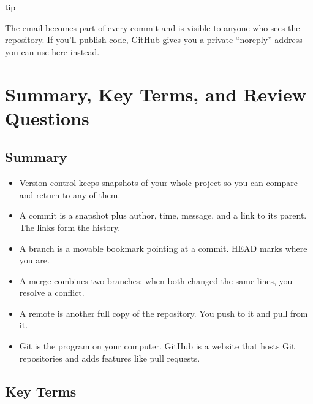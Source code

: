 \begin{callout}{tip}

The email becomes part of every commit and is visible to anyone who sees the repository. If you'll publish code, GitHub gives you a private ``noreply'' address you can use here instead.

\end{callout}

\section{Summary, Key Terms, and Review Questions}\label{04-why-code-needs-a-history:summary-key-terms-and-review-questions}

\subsection*{Summary}\label{04-why-code-needs-a-history:summary}

\begin{itemize}
\tightlist
\item
  Version control keeps snapshots of your whole project so you can compare and return to any of them.
\item
  A commit is a snapshot plus author, time, message, and a link to its parent. The links form the history.
\item
  A branch is a movable bookmark pointing at a commit. HEAD marks where you are.
\item
  A merge combines two branches; when both changed the same lines, you resolve a conflict.
\item
  A remote is another full copy of the repository. You push to it and pull from it.
\item
  Git is the program on your computer. GitHub is a website that hosts Git repositories and adds features like pull requests.
\end{itemize}


\subsection*{Key Terms}\label{04-why-code-needs-a-history:key-terms}

